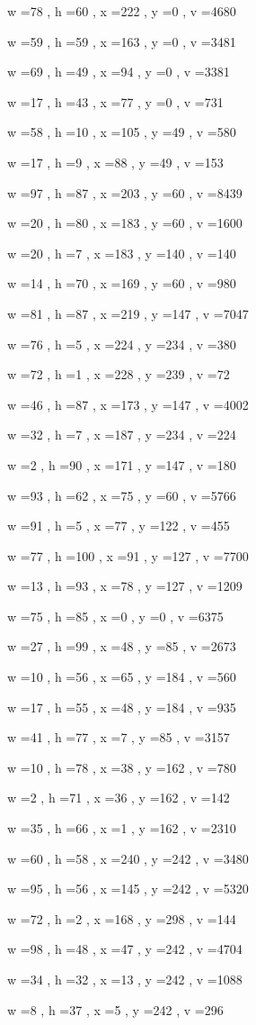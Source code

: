 \documentclass[11pt]{article}
\begin{document}
w =78 , h =60 , x =222 , y =0 , v =4680
\par
w =59 , h =59 , x =163 , y =0 , v =3481
\par
w =69 , h =49 , x =94 , y =0 , v =3381
\par
w =17 , h =43 , x =77 , y =0 , v =731
\par
w =58 , h =10 , x =105 , y =49 , v =580
\par
w =17 , h =9 , x =88 , y =49 , v =153
\par
w =97 , h =87 , x =203 , y =60 , v =8439
\par
w =20 , h =80 , x =183 , y =60 , v =1600
\par
w =20 , h =7 , x =183 , y =140 , v =140
\par
w =14 , h =70 , x =169 , y =60 , v =980
\par
w =81 , h =87 , x =219 , y =147 , v =7047
\par
w =76 , h =5 , x =224 , y =234 , v =380
\par
w =72 , h =1 , x =228 , y =239 , v =72
\par
w =46 , h =87 , x =173 , y =147 , v =4002
\par
w =32 , h =7 , x =187 , y =234 , v =224
\par
w =2 , h =90 , x =171 , y =147 , v =180
\par
w =93 , h =62 , x =75 , y =60 , v =5766
\par
w =91 , h =5 , x =77 , y =122 , v =455
\par
w =77 , h =100 , x =91 , y =127 , v =7700
\par
w =13 , h =93 , x =78 , y =127 , v =1209
\par
w =75 , h =85 , x =0 , y =0 , v =6375
\par
w =27 , h =99 , x =48 , y =85 , v =2673
\par
w =10 , h =56 , x =65 , y =184 , v =560
\par
w =17 , h =55 , x =48 , y =184 , v =935
\par
w =41 , h =77 , x =7 , y =85 , v =3157
\par
w =10 , h =78 , x =38 , y =162 , v =780
\par
w =2 , h =71 , x =36 , y =162 , v =142
\par
w =35 , h =66 , x =1 , y =162 , v =2310
\par
w =60 , h =58 , x =240 , y =242 , v =3480
\par
w =95 , h =56 , x =145 , y =242 , v =5320
\par
w =72 , h =2 , x =168 , y =298 , v =144
\par
w =98 , h =48 , x =47 , y =242 , v =4704
\par
w =34 , h =32 , x =13 , y =242 , v =1088
\par
w =8 , h =37 , x =5 , y =242 , v =296
\par
\newpage
\end{document}
